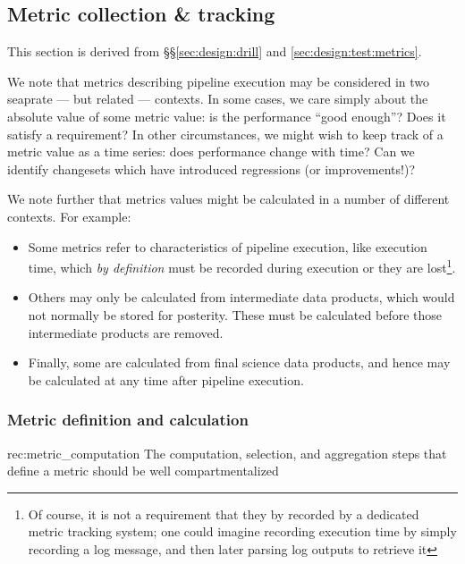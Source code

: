 \subsection{Metric collection \& tracking}
\label{sec:comp:metric}

This section is derived from \S\S\ref{sec:design:drill} and \ref{sec:design:test:metrics}.

We note that metrics describing pipeline execution may be considered in two seaprate --- but related --- contexts.
In some cases, we care simply about the absolute value of some metric value: is the performance ``good enough''?
Does it satisfy a requirement?
In other circumstances, we might wish to keep track of a metric value as a time series: does performance change with time?
Can we identify changesets which have introduced regressions (or improvements!)?

We note further that metrics values might be calculated in a number of different contexts.
For example:

\begin{itemize}

  \item{Some metrics refer to characteristics of pipeline execution, like execution time, which \emph{by definition} must be recorded during execution or they are lost\footnote{Of course, it is not a requirement that they by recorded by a dedicated metric tracking system; one could imagine recording execution time by simply recording a log message, and then later parsing log outputs to retrieve it}.}

  \item{Others may only be calculated from intermediate data products, which would not normally be stored for posterity. These must be calculated before those intermediate products are removed.}

  \item{Finally, some are calculated from final science data products, and hence may be calculated at any time after pipeline execution.}

\end{itemize}

\subsubsection{Metric definition and calculation}
\label{sec:comp:metric:define}

\begin{recommendation}
    {rec:metric_computation}
    {The computation, selection, and aggregation steps that define a metric should be well compartmentalized}
\end{recommendation}

